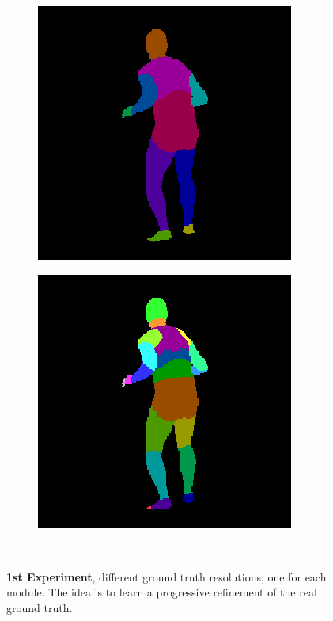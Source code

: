 \documentclass{beamer}
\begin{document}
\begin{frame}
\begin{figure}
\begin{subfigure}{.19\textwidth}
\end{subfigure}
\begin{subfigure}{.19\textwidth}
  \centering
  \includegraphics[scale=0.3]{02_05_c0005_segm_80_12c.png}
\end{subfigure}
\begin{subfigure}{.19\textwidth}
  \centering
  \includegraphics[scale=0.3]{02_05_c0005_segm_80_25c.png}\\
\end{subfigure}\\
\caption{\textbf{1st Experiment}, different ground truth resolutions, one for each module. The idea is to learn a progressive refinement of the real ground truth.}
\label{hourglass:diffgrounds}
\end{figure}


\end{frame}
\end{document}
